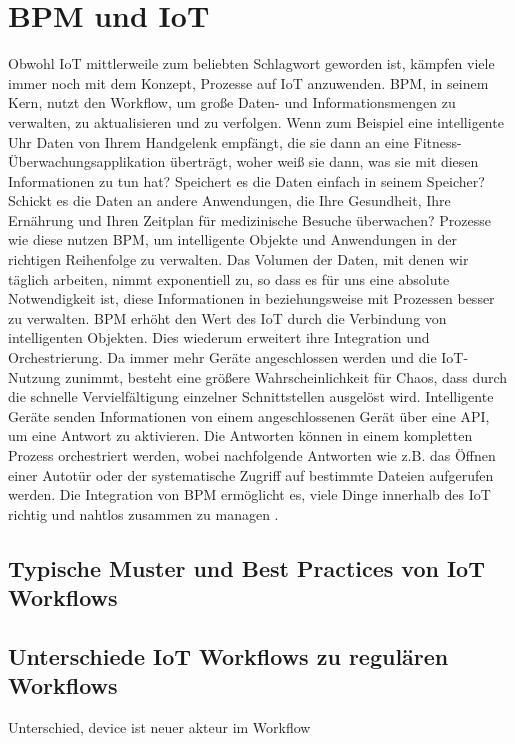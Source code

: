 \documentclass[a4paper, 12pt, twoside, headsepline=true]{scrartcl} %
\begin{document}
\newpage

\section{BPM und IoT}		
Obwohl IoT mittlerweile zum beliebten Schlagwort geworden ist, kämpfen viele immer noch mit dem Konzept, Prozesse auf IoT anzuwenden. BPM, in seinem Kern, nutzt den Workflow, um große Daten- und Informationsmengen zu verwalten, zu aktualisieren und zu verfolgen. Wenn zum Beispiel eine intelligente Uhr Daten von Ihrem Handgelenk empfängt, die sie dann an eine Fitness-Überwachungsapplikation überträgt, woher weiß sie dann, was sie mit diesen Informationen zu tun hat? Speichert es die Daten einfach in seinem Speicher? Schickt es die Daten an andere Anwendungen, die Ihre Gesundheit, Ihre Ernährung und Ihren Zeitplan für medizinische Besuche überwachen? Prozesse wie diese nutzen BPM, um intelligente Objekte und Anwendungen in der richtigen Reihenfolge zu verwalten. Das Volumen der Daten, mit denen wir täglich arbeiten, nimmt exponentiell zu, so dass es für uns eine absolute Notwendigkeit ist, diese Informationen in beziehungsweise mit Prozessen besser zu verwalten. BPM erhöht den Wert des IoT durch die Verbindung von intelligenten Objekten. Dies wiederum erweitert ihre Integration und Orchestrierung. Da immer mehr Geräte angeschlossen werden und die IoT-Nutzung zunimmt, besteht eine größere Wahrscheinlichkeit für Chaos, dass durch die schnelle Vervielfältigung einzelner Schnittstellen ausgelöst wird. Intelligente Geräte senden Informationen von einem angeschlossenen Gerät über eine API, um eine Antwort zu aktivieren. Die Antworten können in einem kompletten Prozess orchestriert werden, wobei nachfolgende Antworten wie z.B. das Öffnen einer Autotür oder der systematische Zugriff auf bestimmte Dateien aufgerufen werden. Die Integration von BPM ermöglicht es, viele Dinge innerhalb des IoT richtig und nahtlos zusammen zu managen \cite{bpmofthings} .


\subsection{Typische Muster und Best Practices von IoT Workflows}

\subsection{Unterschiede IoT Workflows zu regulären Workflows}

Unterschied, device ist neuer akteur im Workflow
\end{document}
